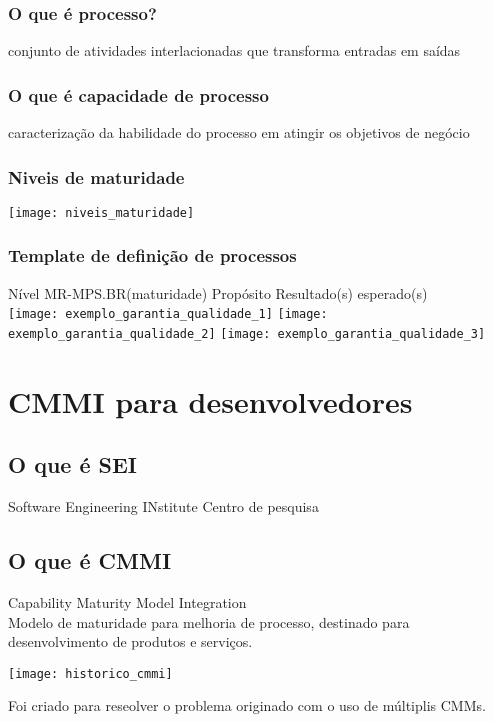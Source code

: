 \documentclass{article}
\begin{document}
\subsubsection{O que é processo?} conjunto de atividades interlacionadas que transforma entradas em saídas
	
\subsubsection{O que é capacidade de processo} caracterização da habilidade do processo em atingir os objetivos de negócio

\subsubsection{Niveis de maturidade}
\texttt{[image: niveis\_maturidade]}

\subsubsection{Template de definição de processos}
Nível MR-MPS.BR(maturidade)
Propósito
Resultado(s) esperado(s) \\

\texttt{[image: exemplo\_garantia\_qualidade\_1]}
\texttt{[image: exemplo\_garantia\_qualidade\_2]}
\texttt{[image: exemplo\_garantia\_qualidade\_3]}


\section{CMMI para desenvolvedores} \date{2 de Abril de 2014}

\subsection{O que é SEI}
	Software Engineering INstitute \newline
	Centro de pesquisa

\subsection{O que é CMMI} 	
	Capability Maturity Model Integration \\
	Modelo de maturidade para melhoria de processo, destinado para desenvolvimento de produtos e serviços. \\
	\begin{center}
		\texttt{[image: historico\_cmmi]} \\
	\end{center}
	Foi criado para reseolver o problema originado com o uso de múltiplis CMMs.
\end{document}
